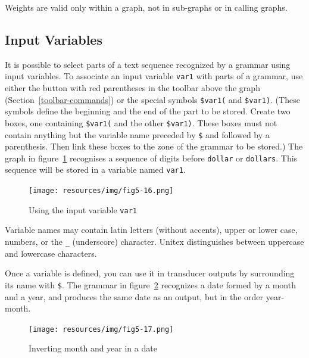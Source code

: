 \bigskip
\noindent Weights are valid only within a graph, not in sub-graphs or in calling graphs.

\subsection{Input Variables}
\label{section-using-variables}
\index{\verbt{\$}}

It is possible to select parts of a text sequence recognized by a grammar using input
variables. To associate an input variable \verb+var1+ with parts of a grammar, use
either the button with red parentheses in the toolbar above the graph
(Section~\ref{toolbar-commands}) or the special symbols \verb+$var1(+ and \verb+$var1)+.
(These symbols define the beginning and the end of the part to be stored.
Create two boxes, one containing \verb+$var1(+ and the other
\verb+$var1)+. These boxes must not contain anything but the variable name
preceded by \verb+$+ and followed by a parenthesis. Then link these boxes to the
zone of the grammar to be stored.)
The graph in figure~\ref{fig-using-variable} recognises a sequence of digits before
\verb+dollar+ or \verb+dollars+. This sequence will be stored in a variable named
\verb+var1+.

\bigskip
\begin{figure}[!ht]
\begin{center}
\texttt{[image: resources/img/fig5-16.png]}
\caption{Using the input variable
\texttt{var1}\label{fig-using-variable}}
\end{center}
\end{figure}

\noindent Variable names may contain latin letters (without accents), upper or
lower case, numbers, or the \verb+_+ (underscore)
character.\index{\verbc{_}} Unitex distinguishes
between uppercase and lowercase characters.

\bigskip
\noindent Once a variable is defined, you can use it in transducer outputs by
surrounding its name with \verb+$+.\index{\verbt{\$}} The grammar in
figure~\ref{fig-date-grammar} recognizes a date formed by a month and a
year, and produces the same date as an output, but in the order year-month.

\bigskip
\begin{figure}[!ht]
\begin{center}
\texttt{[image: resources/img/fig5-17.png]}
\caption{Inverting month and year in a date\label{fig-date-grammar}}
\end{center}
\end{figure}

